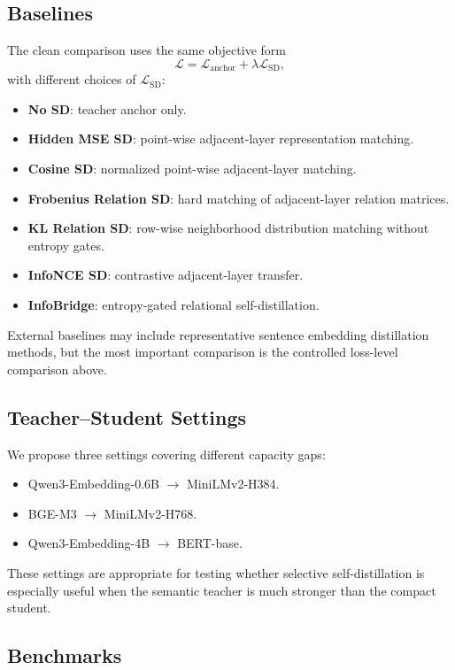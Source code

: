 \documentclass[letterpaper]{article}
\begin{document}
\subsection{Baselines}

The clean comparison uses the same objective form
\begin{equation}
    \mathcal{L}=\mathcal{L}_{\mathrm{anchor}}+\lambda\mathcal{L}_{\mathrm{SD}},
\end{equation}
with different choices of $\mathcal{L}_{\mathrm{SD}}$:
\begin{itemize}
    \item \textbf{No SD}: teacher anchor only.
    \item \textbf{Hidden MSE SD}: point-wise adjacent-layer representation matching.
    \item \textbf{Cosine SD}: normalized point-wise adjacent-layer matching.
    \item \textbf{Frobenius Relation SD}: hard matching of adjacent-layer relation matrices.
    \item \textbf{KL Relation SD}: row-wise neighborhood distribution matching without entropy gates.
    \item \textbf{InfoNCE SD}: contrastive adjacent-layer transfer.
    \item \textbf{InfoBridge}: entropy-gated relational self-distillation.
\end{itemize}
External baselines may include representative sentence embedding distillation methods, but the most important comparison is the controlled loss-level comparison above.

\subsection{Teacher--Student Settings}

We propose three settings covering different capacity gaps:
\begin{itemize}
    \item Qwen3-Embedding-0.6B $\rightarrow$ MiniLMv2-H384.
    \item BGE-M3 $\rightarrow$ MiniLMv2-H768.
    \item Qwen3-Embedding-4B $\rightarrow$ BERT-base.
\end{itemize}
These settings are appropriate for testing whether selective self-distillation is especially useful when the semantic teacher is much stronger than the compact student.

\subsection{Benchmarks}
\end{document}
